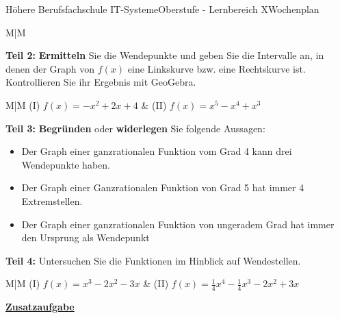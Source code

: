 \documentclass[oneside,openany,headings=optiontotoc,11pt,numbers=noenddot]{scrreprt}
\begin{document}
\begin{worksheet}{Höhere Berufsfachschule IT-Systeme}{Oberstufe - Lernbereich X}{Wochenplan }
\begin{framed}
\begin{tabularx}{\textwidth}{M|M}
			\end{tabularx}
		\end{framed}
		\begin{framed}
			\noindent
			\textbf{Teil 2:} \textbf{Ermitteln} Sie die Wendepunkte und geben Sie die Intervalle an, in denen der Graph von \(f(x)\) eine Linkskurve bzw. eine Rechtskurve ist.\\
			Kontrollieren Sie ihr Ergebnis mit GeoGebra.\\
			\par\noindent
			\renewcommand{\arraystretch}{1.5}
			\begin{tabularx}{\textwidth}{M|M}
				(I) \(f(x) = -x^2 + 2x + 4\) & (II) \(f(x) = x^5-x^4+x^3\)\\
				\hline
			\end{tabularx}
		\end{framed}
		\newpage
		\begin{framed}
			\noindent
			\textbf{Teil 3:} \textbf{Begründen} oder \textbf{widerlegen} Sie folgende Aussagen:
			\begin{itemize}[label=-]
				\item Der Graph einer ganzrationalen Funktion vom Grad 4 kann drei Wendepunkte haben.
				\item Der Graph einer Ganzrationalen Funktion von Grad 5 hat immer 4 Extremstellen.
				\item Der Graph einer ganzrationalen Funktion von ungeradem Grad hat immer den Ursprung als Wendepunkt
			\end{itemize}
		\end{framed}
		\begin{framed}
			\noindent
			\textbf{Teil 4:} Untersuchen Sie die Funktionen im Hinblick auf Wendestellen.\\
			\par\noindent
			\renewcommand{\arraystretch}{1.5}
			\begin{tabularx}{\textwidth}{M|M}
				(I) \(f(x) = x^3 - 2x^2 -3x\) & (II) \(f(x) = \frac{1}{4}x^4-\frac{1}{4}x^3 -2x^2 +3x\)\\
				\hline
				\multicolumn{2}{c}{(III) \(f(x) = -x^6 + 6x^4 -9x^2 + 4\)}
			\end{tabularx}
		\end{framed}
		\begin{framed}
			\noindent
			\textbf{\underline{Zusatzaufgabe}}\\
			\par\noindent

\end{framed}
\end{worksheet}
\end{document}
